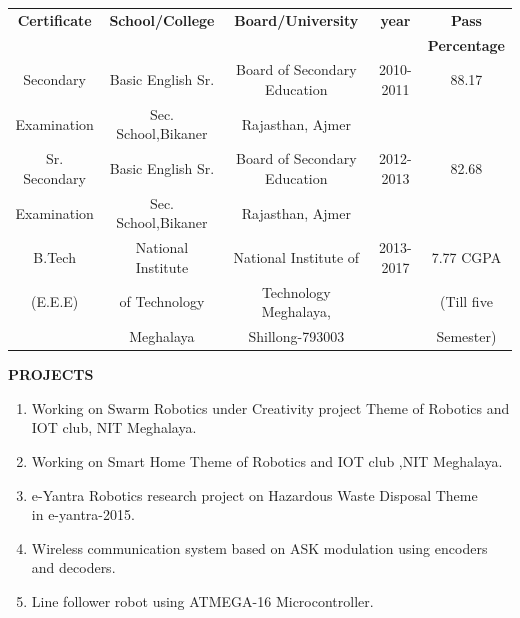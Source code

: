 \documentclass{article}
\begin{document}
	\begin{tabular}{|c|c|c|c|c|}
		\hline
		\textbf{Certificate} & \textbf{School/College} & \textbf{Board/University} &  \textbf{year} & \textbf{Pass}   \\
		&        &            &              & \textbf{Percentage}\\
		\hline
		
		Secondary & Basic English Sr. & Board of Secondary Education & 2010-2011 &88.17 \\
		Examination&Sec. School,Bikaner & Rajasthan, Ajmer& & \\
		\hline
		Sr. Secondary & Basic English Sr. & Board of Secondary Education & 2012-2013 &82.68 \\
		Examination&Sec. School,Bikaner & Rajasthan, Ajmer& & \\
		\hline
		B.Tech & National Institute & National Institute of  & 2013-2017 &7.77 CGPA\\
		(E.E.E)	&of Technology &Technology Meghalaya, & &(Till five \\
		& Meghalaya &Shillong-793003& &Semester) \\
		\hline
	\end{tabular}
	
	 \begin{flushleft} 
	 	\vspace{0.2in}
	 	\textbf{PROJECTS}
	 	\begin{enumerate}
	 		\vspace{-0.29in}
	 		\addtolength{\itemindent}{1.359in}
	 		\item  Working on Swarm Robotics under Creativity project Theme of Robotics and\\ \hspace*{3.5cm}IOT club, NIT Meghalaya.
	 		\item  Working on Smart Home Theme of Robotics and IOT club ,NIT Meghalaya.
	 		\item  e-Yantra Robotics research project on Hazardous Waste Disposal Theme\\ \hspace*{3.5cm}in e-yantra-2015. 
	 		\item  Wireless communication system based on ASK modulation using encoders \\\hspace*{3.5cm}and decoders.  
	 		\item  Line follower robot using ATMEGA-16 Microcontroller.
	 	\end{enumerate}
	 \end{flushleft}
	 
\end{document}
